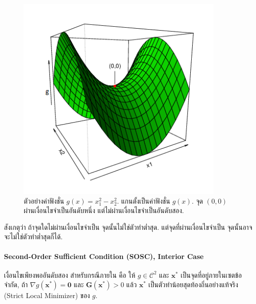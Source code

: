%
\begin{figure}
\begin{center}
\includegraphics[width=4.0in]
{02Background/SONCexample02.png}
\end{center}
\caption{ตัวอย่างค่าฟังชั่น $g(x) = x_1^2 - x_2^2$.
แกนตั้งเป็นค่าฟังชั่น $g(x)$.
จุด $(0,0)$ ผ่านเงื่อนไขจำเป็นอันดับหนึ่ง แต่ไม่ผ่านเงื่อนไขจำเป็นอันดับสอง.}
\label{fig: SONC example}
\end{figure}
%

สังเกตุว่า ถ้าจุดใดไม่ผ่านเงื่อนไขจำเป็น จุดนั้นไม่ใช่ตัวทำต่ำสุด.
แต่จุดที่ผ่านเงื่อนไขจำเป็น จุดนั้นอาจจะไม่ใช่ตัวทำต่ำสุดก็ได้.

\paragraph{Second-Order Sufficient Condition (SOSC), Interior Case} 
เงื่อนไขเพียงพออันดับสอง สำหรับกรณีภายใน คือ
ให้ $g \in \mathcal{C}^2$ และ $\mathbf{x}^*$ เป็นจุดที่อยู่ภายในเซตข้อจำกัด,
ถ้า $\nabla g(\mathbf{x}^*) = \mathbf{0}$ และ 
$\mathbf{G}(\mathbf{x}^*) > 0$ แล้ว $\mathbf{x}^*$ เป็นตัวทำน้อยสุดท้องถิ่นอย่างแท้จริง (Strict Local Minimizer) ของ $g$.


